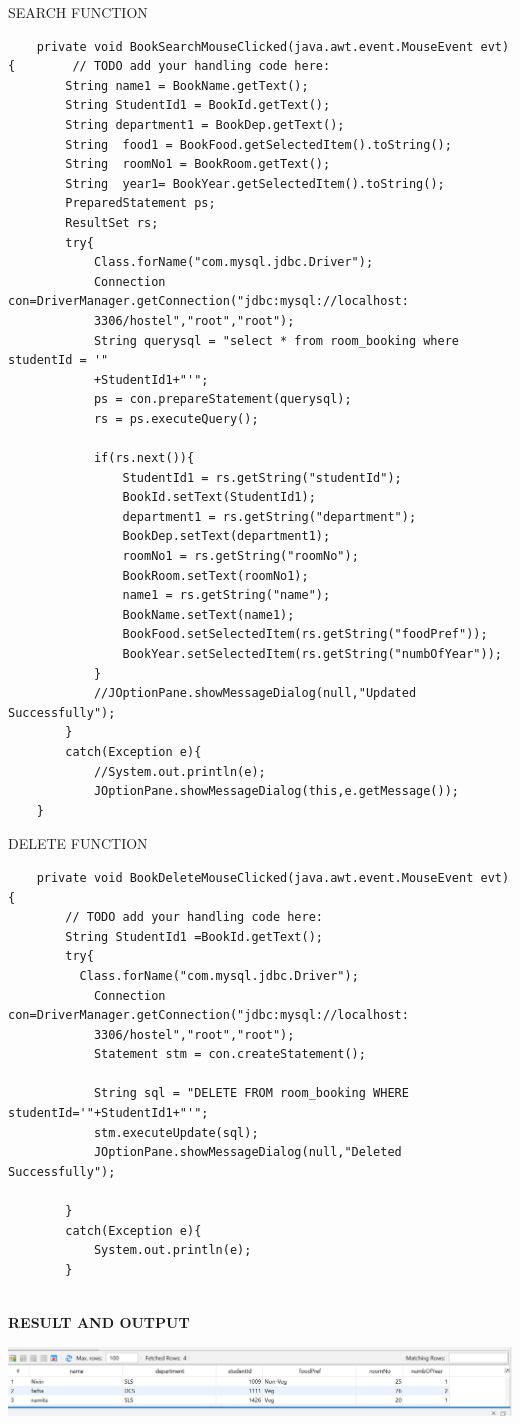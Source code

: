 \documentclass[a4paper,12pt]{report}
\begin{document}
SEARCH FUNCTION
\begin{verbatim}
    private void BookSearchMouseClicked(java.awt.event.MouseEvent evt) {        // TODO add your handling code here:
        String name1 = BookName.getText();
        String StudentId1 = BookId.getText();
        String department1 = BookDep.getText();
        String  food1 = BookFood.getSelectedItem().toString();
        String  roomNo1 = BookRoom.getText();
        String  year1= BookYear.getSelectedItem().toString();
        PreparedStatement ps;
        ResultSet rs;
        try{
            Class.forName("com.mysql.jdbc.Driver");
            Connection con=DriverManager.getConnection("jdbc:mysql://localhost:
            3306/hostel","root","root");
            String querysql = "select * from room_booking where studentId = '"
            +StudentId1+"'";
            ps = con.prepareStatement(querysql);
            rs = ps.executeQuery();
            
            if(rs.next()){
                StudentId1 = rs.getString("studentId");
                BookId.setText(StudentId1);
                department1 = rs.getString("department");
                BookDep.setText(department1);
                roomNo1 = rs.getString("roomNo");
                BookRoom.setText(roomNo1);
                name1 = rs.getString("name");
                BookName.setText(name1);
                BookFood.setSelectedItem(rs.getString("foodPref"));
                BookYear.setSelectedItem(rs.getString("numbOfYear"));
            }
            //JOptionPane.showMessageDialog(null,"Updated Successfully");
        }
        catch(Exception e){
            //System.out.println(e);
            JOptionPane.showMessageDialog(this,e.getMessage());
    }                     
\end{verbatim}

DELETE FUNCTION
\begin{verbatim}
    private void BookDeleteMouseClicked(java.awt.event.MouseEvent evt) {                                        
        // TODO add your handling code here:
        String StudentId1 =BookId.getText();
        try{
          Class.forName("com.mysql.jdbc.Driver");
            Connection con=DriverManager.getConnection("jdbc:mysql://localhost:
            3306/hostel","root","root");
            Statement stm = con.createStatement();
           
            String sql = "DELETE FROM room_booking WHERE studentId='"+StudentId1+"'";
            stm.executeUpdate(sql);
            JOptionPane.showMessageDialog(null,"Deleted Successfully");

        }
        catch(Exception e){
            System.out.println(e);
        }
        
\end{verbatim}
\begin{flushleft}
		\textbf{RESULT AND OUTPUT}
\end{flushleft} 
\includegraphics[scale=0.4]{Screenshot (490).png}
\end{document}
